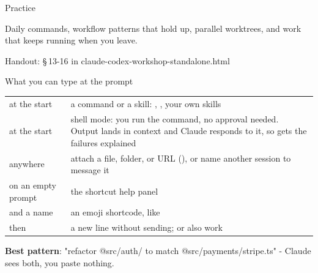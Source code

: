 \documentclass[aspectratio=169,11pt,t]{beamer}
\newcommand{\partframe}[4]{%
  \setsec{}%
  \begin{frame}[c]
    \lbl{Part #1}\par\vspace{0.5em}
    {\seriffamily\fontsize{40}{42}\selectfont #2}\par\vspace{0.8em}
    \begin{minipage}{0.8\textwidth}\raggedright\color{muted}#4\end{minipage}\par\vspace{1.4em}
    {\ttfamily\scriptsize\color{dim}Handout: \S\,#3 in claude-codex-workshop-standalone.html}
  \end{frame}}
\begin{document}
\partframe{IV}{Practice}{13-16}{Daily commands, workflow patterns that hold up, parallel worktrees, and work that keeps running when you leave.}

\begin{frame}{What you can type at the prompt}
  \footnotesize
  \begin{tabularx}{\textwidth}{@{}L{3.6cm}Y@{}}
    \toprule
     & \\
    \midrule
    \cmd{/} at the start & a command or a skill: , , your own skills\\
    \cmd{!} at the start & shell mode: you run the command, no approval needed. Output lands in context and Claude responds to it, so  gets the failures explained\\
     anywhere & attach a file, folder, or URL (), or name another session to message it\\
     on an empty prompt & the shortcut help panel\\
    \cmd{:} and a name & an emoji shortcode, like \\
    \kbd{\textbackslash} then  & a new line without sending;  or  also work\\
    \bottomrule
  \end{tabularx}\par\vspace{0.4em}
  {\footnotesize\textbf{Best pattern}: "refactor @src/auth/ to match @src/payments/stripe.ts" - Claude sees both, you paste nothing.}
\end{frame}
\end{document}
